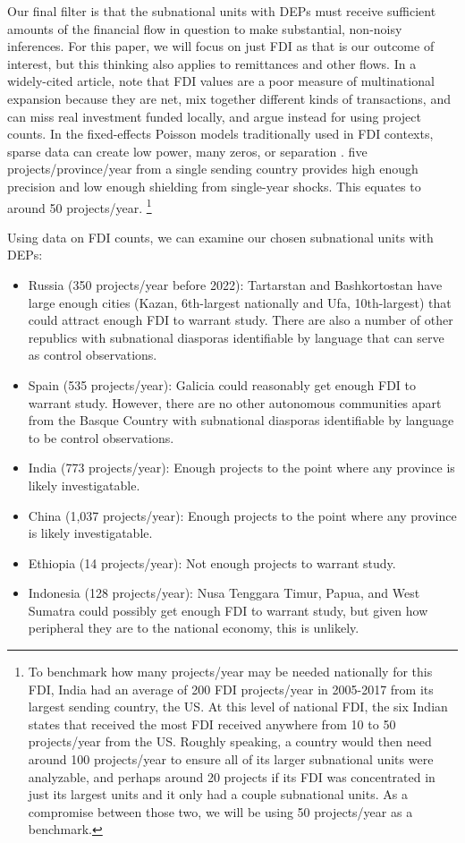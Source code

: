 \documentclass[12pt]{article}
\begin{document}
    Our final filter is that the subnational units with DEPs must receive sufficient amounts of the financial flow in question to make substantial, non-noisy inferences. For this paper, we will focus on just FDI as that is our outcome of interest, but this thinking also applies to remittances and other flows. In a widely-cited article, \citet{desbordes_effects_2017} note that FDI values are a poor measure of multinational expansion because they are net, mix together different kinds of transactions, and can miss real investment funded locally, and argue instead for using project counts. In the fixed-effects Poisson models traditionally used in FDI contexts, sparse data can create low power, many zeros, or separation \citep{santos_silva_further_2011}. five projects/province/year from a single sending country provides high enough precision and low enough shielding from single-year shocks. This equates to around 50 projects/year. \footnote{To benchmark how many projects/year may be needed nationally for this FDI, India had an average of 200 FDI projects/year in 2005-2017 from its largest sending country, the US. At this level of national FDI, the six Indian states that received the most FDI received anywhere from 10 to 50 projects/year from the US. Roughly speaking, a country would then need around 100 projects/year to ensure all of its larger subnational units were analyzable, and perhaps around 20 projects if its FDI was concentrated in just its largest units and it only had a couple subnational units. As a compromise between those two, we will be using 50 projects/year as a benchmark.} 
    
    Using \citet{unctad_world_2025} data on FDI counts, we can examine our chosen subnational units with DEPs:
        \begin{itemize}
        \item Russia (350 projects/year before 2022): Tartarstan and Bashkortostan have large enough cities (Kazan, 6th-largest nationally and Ufa, 10th-largest) that could attract enough FDI to warrant study. There are also a number of other republics with subnational diasporas identifiable by language that can serve as control observations.
        \item Spain (535 projects/year): Galicia could reasonably get enough FDI to warrant study. However, there are no other autonomous communities apart from the Basque Country with subnational diasporas identifiable by language to be control observations.
        \item India (773 projects/year): Enough projects to the point where any province is likely investigatable.
        \item China (1,037 projects/year): Enough projects to the point where any province is likely investigatable.
        \item Ethiopia (14 projects/year): Not enough projects to warrant study.
        \item Indonesia (128 projects/year): Nusa Tenggara Timur, Papua, and West Sumatra could possibly get enough FDI to warrant study, but given how peripheral they are to the national economy, this is unlikely.
    \end{itemize}
    
\end{document}
